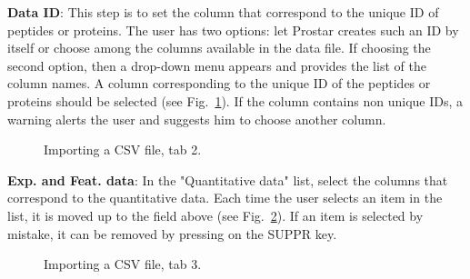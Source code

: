 \documentclass[12pt]{article}
\begin{document}
{\textbf {Data ID}: This step is to set the column that correspond to the unique ID of peptides or proteins. The user has two options: let Prostar creates such an ID by itself or choose among the columns available in the data file. If choosing the second option, then a drop-down menu appears and provides the list of the column names. A column corresponding to the unique ID of the peptides or proteins should be selected (see Fig.~\ref{fig:imp2}). If the column contains non unique IDs, a warning alerts the user and suggests him to choose another column.}
\begin {figure}
\centering
{}
\caption{Importing a CSV file, tab 2.}\label{fig:imp2}
\end {figure}

\textbf {Exp. and Feat. data}: In the "Quantitative data" list, select the columns that correspond to the quantitative data. Each time the user selects an item in the list, it is moved up to the field above (see Fig.~\ref{fig:imp3}). If an item is selected by mistake, it can be removed by pressing on the SUPPR key.
\begin {figure}
\centering
{}
\caption{Importing a CSV file, tab 3.}\label{fig:imp3}
\end {figure}
\end{document}
